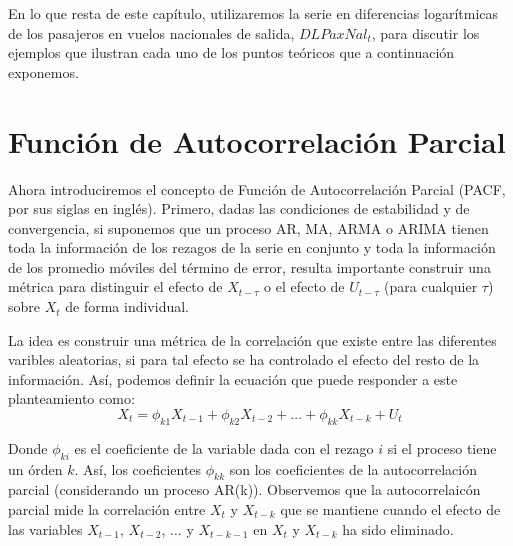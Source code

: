 \documentclass[
]{book}
\begin{document}
En lo que resta de este capítulo, utilizaremos la serie en diferencias logarítmicas de los pasajeros en vuelos nacionales de salida, \(DLPaxNal_t\), para discutir los ejemplos que ilustran cada uno de los puntos teóricos que a continuación exponemos.

\hypertarget{funciuxf3n-de-autocorrelaciuxf3n-parcial}{%
\section{Función de Autocorrelación Parcial}\label{funciuxf3n-de-autocorrelaciuxf3n-parcial}}

Ahora introduciremos el concepto de Función de Autocorrelación Parcial (PACF, por sus siglas en inglés). Primero, dadas las condiciones de estabilidad y de convergencia, si suponemos que un proceso AR, MA, ARMA o ARIMA tienen toda la información de los rezagos de la serie en conjunto y toda la información de los promedio móviles del término de error, resulta importante construir una métrica para distinguir el efecto de \(X_{t - \tau}\) o el efecto de \(U_{t - \tau}\) (para cualquier \(\tau\)) sobre \(X_t\) de forma individual.

La idea es construir una métrica de la correlación que existe entre las diferentes varibles aleatorias, si para tal efecto se ha controlado el efecto del resto de la información. Así, podemos definir la ecuación que puede responder a este planteamiento como:
\begin{equation}
    X_t = \phi_{k1} X_{t-1} + \phi_{k2} X_{t-2} + \ldots + \phi_{kk} X_{t-k} + U_t
    \label{eq:PACFEq}
\end{equation}

Donde \(\phi_{ki}\) es el coeficiente de la variable dada con el rezago \(i\) si el proceso tiene un órden \(k\). Así, los coeficientes \(\phi_{kk}\) son los coeficientes de la autocorrelación parcial (considerando un proceso AR(k)). Observemos que la autocorrelaicón parcial mide la correlación entre \(X_t\) y \(X_{t-k}\) que se mantiene cuando el efecto de las variables \(X_{t-1}\), \(X_{t-2}\), \(\ldots\) y \(X_{t-k-1}\) en \(X_{t}\) y \(X_{t-k}\) ha sido eliminado.
\end{document}

